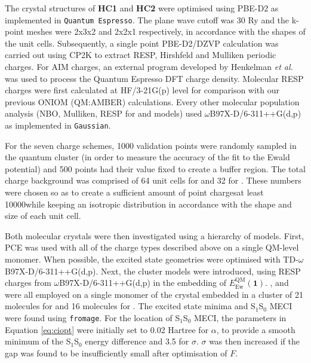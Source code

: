 The crystal structures of \textbf{HC1} and \textbf{HC2} were optimised using PBE-D2 as implemented in \texttt{Quantum Espresso}. \cite{Giannozzi2009} The plane wave cutoff was 30 Ry and the k-point meshes were 2x3x2 and 2x2x1 respectively, in accordance with the shapes of the unit cells. Subsequently, a single point PBE-D2/DZVP calculation was carried out using CP2K \cite{cp2k} to extract RESP, Hirshfeld and Mulliken periodic charges. For AIM charges, an external program developed by Henkelman \textit{et al.} was used to process the Quantum Espresso DFT charge density\cite{Henkelman2006,Sanville2007,Yu2011,Tang2009}. Molecular RESP charges were first calculated at HF/3-21G(p) level for comparison with our previous ONIOM (QM:AMBER) calculations.\cite{Dommett2017a} Every other molecular population analysis (NBO, Mulliken, RESP for \EEC{} and \SCEEC{} models) used $\omega$B97X-D/6-311++G(d,p) as implemented in \texttt{Gaussian}. 

For the seven charge schemes, 1000 validation points were randomly sampled in the quantum cluster (in order to measure the accuracy of the fit to the Ewald potential) and 500 points had their value fixed to create a buffer region. The total charge background was comprised of 64 unit cells for \HC{} and 32 for \HCC{}. These numbers were chosen so as to create a sufficient amount of point charges\cite{Derenzo2000}\textemdash{}at least 10000\textemdash{}while keeping an isotropic distribution in accordance with the shape and size of each unit cell.

Both molecular crystals were then investigated using a hierarchy of models. First, PCE was used with all of the charge types described above on a single QM-level monomer. When possible, the excited state geometries were optimised with TD-$\omega$B97X-D/6-311++G(d,p). Next, the cluster models were introduced, using RESP charges from $\omega$B97X-D/6-311++G(d,p) in the embedding of $E^{\text{QM}}_{\text{Ew}}(\textbf{1})$. \EC{}, \EEC{} and \SCEEC{} were all employed on a single monomer of the crystal embedded in a cluster of 21 molecules for \HC{} and 16 molecules for \HCC{}. The excited state minima and S$_1$\textendash{}S$_0$ MECI were found using \texttt{fromage}. For the location of S$_1$\textendash{}S$_0$ MECI, the parameters in Equation \ref{eq:ciopt} were initially set to 0.02 Hartree for $\alpha$, to provide a smooth minimum of the S$_1$\textendash{}S$_0$ energy difference and 3.5 for $\sigma$. $\sigma$ was then increased if the gap was found to be insufficiently small after optimisation of $F$.

